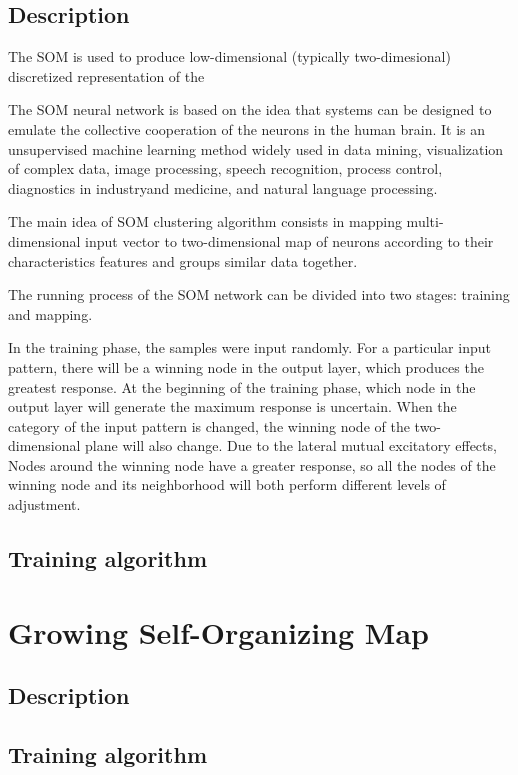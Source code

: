 \documentclass[thesis=M,english]{FITthesis}[2019/12/23]
\begin{document}
\subsection{Description}

The SOM is used to produce low-dimensional (typically two-dimesional) discretized representation of the 

The SOM neural network is based on the idea that systems can be designed to emulate the collective cooperation of the neurons in the human brain. It is an unsupervised machine learning method widely used in data mining, visualization of complex data, image processing, speech recognition, process control, diagnostics in industryand medicine, and natural language processing.

The main idea of SOM clustering algorithm consists in mapping multi-dimensional input vector to two-dimensional map of neurons according to their characteristics features and groups similar data together.

The running process of the SOM network can be divided into two stages: training and mapping.

In the training phase, the samples were input randomly. For a particular input pattern, there will be a winning node in the output layer, which produces the greatest response. At the beginning of the training phase, which node in the output layer will generate the maximum response is uncertain. When the category of the input pattern is changed, the winning node of the two-dimensional plane will also change. Due to the lateral mutual excitatory effects, Nodes around the winning node have a greater response, so all the nodes of the winning node and its neighborhood will both perform different levels of adjustment.
\subsection{Training algorithm}

\section{Growing Self-Organizing Map}
\subsection{Description}
\subsection{Training algorithm}
\end{document}
